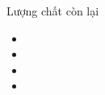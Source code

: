 \begin{dang}{Lượng chất còn lại}
\begin{itemize}
	\item 
	\item 
	\item 
	\item
\end{itemize}
\end{dang}
